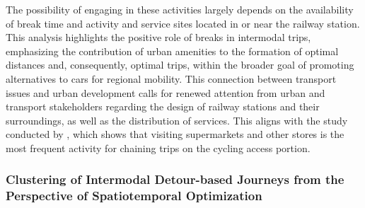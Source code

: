 \begin{refsegment}
The possibility of engaging in these activities largely depends on the availability of break time and activity and service sites located in or near the railway station. This analysis highlights the positive role of breaks in intermodal trips, emphasizing the contribution of urban amenities to the formation of optimal distances and, consequently, optimal trips, within the broader goal of promoting alternatives to cars for regional mobility. This connection between transport issues and urban development calls for renewed attention from urban and transport stakeholders regarding the design of railway stations and their surroundings, as well as the distribution of services. This aligns with the study conducted by \textcolor{blue}{\textcite[468]{jonkeren_bicycle_2021}}, which shows that visiting supermarkets and other stores is the most frequent activity for chaining trips on the cycling access portion.%

\subsubsection*{Clustering of Intermodal Detour-based Journeys from the Perspective of Spatiotemporal Optimization
    \label{chap5:clusterisation-detours}
    }


\end{refsegment}
